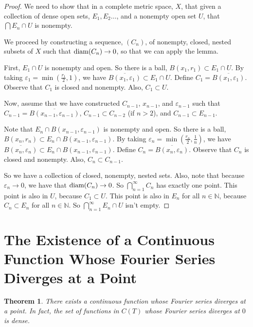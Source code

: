 \documentclass{amsart}
\newcommand{\vep}{\varepsilon}
\newcommand{\N}{\mathbb{N}}
\newcommand{\diam}{\text{\rm diam}}
\newtheorem{thm}{Theorem}[section]
\theoremstyle{definition}
\begin{document}
\begin{proof}
We need to show that in a complete metric space, $X$, that given a collection of dense open sets, $E_1, E_2 \ldots$, and a nonempty open set $U$, that $\bigcap E_n \cap U$ is nonempty.

We proceed by constructing a sequence, $(C_n)$, of nonempty, closed, nested subsets of $X$ such that $\diam(C_n) \to 0$, so that we can apply the lemma.

First, $E_1 \cap U$ is nonempty and open.
So there is a ball, $B(x_1,r_1) \subset E_1 \cap U$.
By taking $\vep_1 = \min(\frac{r_1}{2},1)$, we have $\overline{B(x_1,\vep_1)} \subset E_1 \cap U$.
Define $C_1 = \overline{B(x_1,\vep_1)}$.
Observe that $C_1$ is closed and nonempty. Also, $C_1 \subset U$.

Now, assume that we have constructed $C_{n-1}$, $x_{n-1}$, and $\vep_{n-1}$ such that $C_{n-1} = \overline{B(x_{n-1},\vep_{n-1})}$, $C_{n-1} \subset C_{n-2}$ (if $n >2$), and $C_{n-1} \subset E_{n-1}$.

Note that $E_n \cap B(x_{n-1},\vep_{n-1})$ is nonempty and open.
So there is a ball, $B(x_n,r_n) \subset E_n \cap B(x_{n-1},\vep_{n-1})$.
By taking $\vep_n = \min(\frac{r_n}{2},\frac{1}{n})$, we have $\overline{B(x_n,\vep_n)} \subset E_n \cap B(x_{n-1},\vep_{n-1})$.
Define $C_n = \overline{B(x_n,\vep_n)}$.
Observe that $C_n$ is closed and nonempty. Also, $C_n \subset C_{n-1}$.

So we have a collection of closed, nonempty, nested sets.
Also, note that because $\vep_n \to 0$, we have that $\diam(C_n) \to 0$. 
So $\bigcap\limits_{n=1}^\infty C_n$ has exactly one point.
This point is also in $U$, because $C_1 \subset U$.
This point is also in $E_n$ for all $n \in \N$, because $C_n \subset E_n$ for all $n \in \N$.
So $\bigcap\limits_{n=1}^\infty E_n \cap U$ isn't empty.

\end{proof}

\section{The Existence of a Continuous Function Whose Fourier Series Diverges at a Point}

\begin{thm}
There exists a continuous function whose Fourier series diverges at a point.
In fact, the set of functions in $C(T)$ whose Fourier series diverges at $0$ is dense.
\end{thm}
\end{document}

